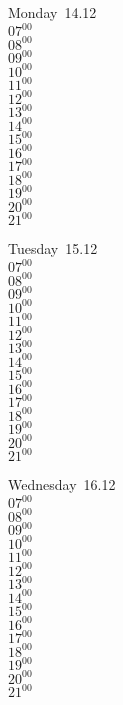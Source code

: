 \documentclass[11pt,a4paper]{book}\usepackage[]{graphicx}\usepackage[]{color}
\begin{document}
\begin{headerbox}
\end{headerbox}
\begin{weekdaybox}
  Monday~14.12\\
  { 
  \vfill
  $07^{00}$\\
$08^{00}$\\
$09^{00}$\\
$10^{00}$\\
$11^{00}$\\
$12^{00}$\\
$13^{00}$\\
$14^{00}$\\
$15^{00}$\\
$16^{00}$\\
$17^{00}$\\
$18^{00}$\\
$19^{00}$\\
$20^{00}$\\
$21^{00}$\\
  }
\end{weekdaybox}
\begin{weekdaybox}
  Tuesday~15.12\\
  { 
  \vfill
  $07^{00}$\\
$08^{00}$\\
$09^{00}$\\
$10^{00}$\\
$11^{00}$\\
$12^{00}$\\
$13^{00}$\\
$14^{00}$\\
$15^{00}$\\
$16^{00}$\\
$17^{00}$\\
$18^{00}$\\
$19^{00}$\\
$20^{00}$\\
$21^{00}$\\
  }
\end{weekdaybox}
\begin{weekdaybox}
  Wednesday~16.12\\
  { 
  \vfill
  $07^{00}$\\
$08^{00}$\\
$09^{00}$\\
$10^{00}$\\
$11^{00}$\\
$12^{00}$\\
$13^{00}$\\
$14^{00}$\\
$15^{00}$\\
$16^{00}$\\
$17^{00}$\\
$18^{00}$\\
$19^{00}$\\
$20^{00}$\\
$21^{00}$\\
  }
\end{weekdaybox}
\end{document}
